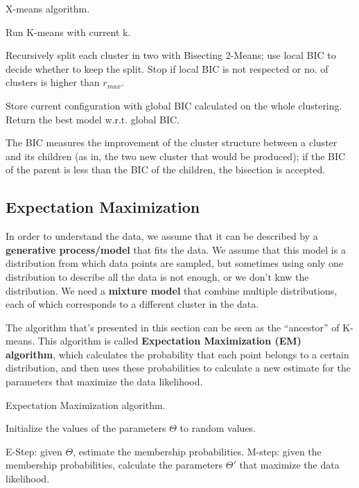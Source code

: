 \begin{algorithm}
\caption{X-means algorithm.}
\begin{algorithmic}[1]
        \State Run K-means with current k.
        
        \State Recursively split each cluster in two with Bisecting 2-Means; use local BIC to decide whether to keep the split. Stop if local BIC is not respected or no. of clusters is higher than $r_{max}$.

        \State Store current configuration with global BIC calculated on the whole clustering.
    \EndFor
    \State Return the best model w.r.t. global BIC.
\end{algorithmic}
\end{algorithm}

The BIC measures the improvement of the cluster structure between a cluster and its children (as in, the two new cluster that would be produced); if the BIC of the parent is less than the BIC of the children, the bisection is accepted.

\subsection{Expectation Maximization}

In order to understand the data, we assume that it can be described by a \textbf{generative process/model} that fits the data. We assume that this model is a distribution from which data points are sampled, but sometimes using only one distribution to describe all the data is not enough, or we don't knw the distribution. We need a \textbf{mixture model} that combine multiple distributions, each of which corresponds to a different cluster in the data.

The algorithm that's presented in this section can be seen as the ``ancestor'' of K-means. This algorithm is called \textbf{Expectation Maximization (EM) algorithm}, which calculates the probability that each point belongs to a certain distribution, and then uses these probabilities to calculate a new estimate for the parameters that maximize the data likelihood.

\begin{algorithm}
\caption{Expectation Maximization algorithm.}
\begin{algorithmic}[1]
    \State Initialize the values of the parameters $\Theta$ to random values.

    \Repeat
        \State E-Step: given $\Theta$, estimate the membership probabilities.
        \State M-step: given the membership probabilities, calculate the parameters $\Theta'$ that maximize the data likelihood.
\end{algorithmic}
\end{algorithm}


